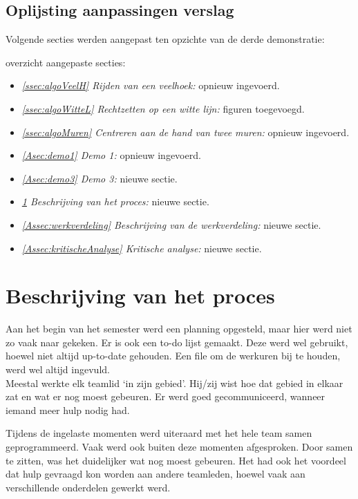 \documentclass[t1]{penoverslag}
\begin{document}
\subsection{Oplijsting aanpassingen verslag} %
\label{Assec:aanp3}
Volgende secties werden aangepast ten opzichte van de derde demonstratie:

overzicht aangepaste secties:
\begin{itemize}
	\item \textit{\ref{ssec:algoVeelH} Rijden van een veelhoek:} opnieuw ingevoerd.
	\item \textit{\ref{ssec:algoWitteL} Rechtzetten op een witte lijn:} figuren toegevoegd.
	\item \textit{\ref{ssec:algoMuren} Centreren aan de hand van twee muren:} opnieuw ingevoerd.
	\item \textit{\ref{Asec:demo1} Demo 1:} opnieuw ingevoerd.
	\item \textit{\ref{Asec:demo3} Demo 3:} nieuwe sectie.
	\item \textit{\ref{Assec:beschrijvingProces} Beschrijving van het proces:} nieuwe sectie.
	\item \textit{\ref{Assec:werkverdeling} Beschrijving van de werkverdeling:} nieuwe sectie.
	\item \textit{\ref{Assec:kritischeAnalyse} Kritische analyse:} nieuwe sectie.
\end{itemize}

\section{Beschrijving van het proces}
\label{Assec:beschrijvingProces}
Aan het begin van het semester werd een planning opgesteld, maar hier werd niet zo vaak naar gekeken. Er is ook een to-do lijst gemaakt. Deze werd wel gebruikt, hoewel niet altijd up-to-date gehouden. Een file om de werkuren bij te houden, werd wel altijd ingevuld.\\

Meestal werkte elk teamlid `in zijn gebied'. Hij/zij wist hoe dat gebied in elkaar zat en wat er nog moest gebeuren. Er werd goed gecommuniceerd, wanneer iemand meer hulp nodig had.

Tijdens de ingelaste momenten werd uiteraard met het hele team samen geprogrammeerd. Vaak werd ook buiten deze momenten afgesproken. Door samen te zitten, was het duidelijker wat nog moest gebeuren. Het had ook het voordeel dat hulp gevraagd kon worden aan andere teamleden, hoewel vaak aan verschillende onderdelen gewerkt werd.
\end{document}
